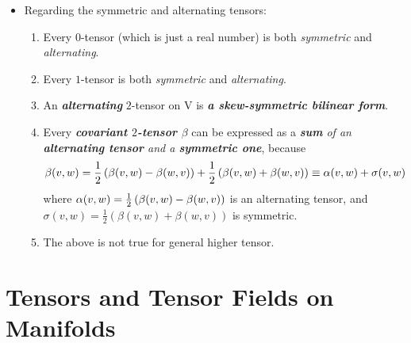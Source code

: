 \documentclass[11pt]{article}
\begin{document}
\begin{itemize}
\item \begin{remark} Regarding the symmetric and alternating tensors:
\begin{enumerate}
\item Every $0$-tensor (which is just a real number) is both \textit{symmetric} and \emph{alternating}.
\item Every $1$-tensor is both \emph{symmetric} and \emph{alternating}.
\item An \textit{\textbf{alternating}} $2$-tensor on V is \emph{\textbf{a skew-symmetric bilinear form}}.
\item Every \emph{\textbf{covariant $2$-tensor $\beta$}} can be expressed as a \emph{\textbf{sum} of an \textbf{alternating tensor} and a \textbf{symmetric one}}, because
\begin{align*}
\beta(v, w) &= \frac{1}{2}\left(\beta(v, w) - \beta(w, v)\right) + \frac{1}{2}\left(\beta(v, w)+ \beta(w, v)\right) \equiv \alpha(v, w) + \sigma(v, w)
\end{align*}
where $\alpha(v,w) = \frac{1}{2}\left(\beta(v, w) - \beta(w, v)\right)$ is an alternating tensor, and $ \sigma(v, w) =  \frac{1}{2}(\beta(v, w)+ \beta(w, v))$ is symmetric.
\item The above is not true for general higher tensor.
\end{enumerate}
\end{remark}
\end{itemize}

\section{Tensors and Tensor Fields on Manifolds}
\end{document}
